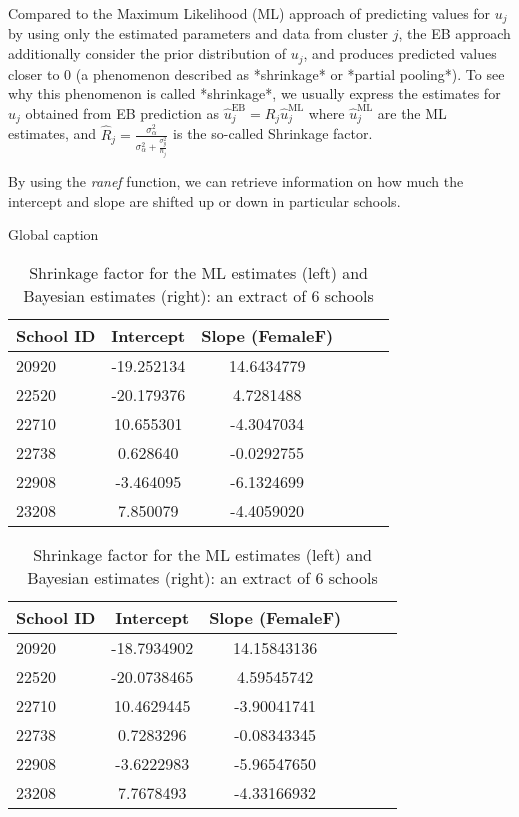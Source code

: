 Compared to the Maximum Likelihood (ML) approach of predicting values for $u_j$ by using only the estimated parameters and data from cluster $j$, the EB approach additionally consider the prior distribution of $u_{j}$, and produces predicted values closer to $0$ (a phenomenon described as *shrinkage* or *partial pooling*).  To see why this phenomenon is called *shrinkage*, we usually express the estimates for $u_j$ obtained from EB prediction as $\hat{u}_j^{\text{EB}} = \hat{R}_j\hat{u}_j^{\text{ML}}$ where $\hat{u}_j^{\text{ML}}$ are the ML estimates, and $\hat{R}_j = \frac{\sigma_\alpha^2}{\sigma_\alpha^2 + \frac{\sigma_y^2}{n_j}}$ is the so-called Shrinkage factor.

By using the \textit{ranef} function, we can retrieve information on how much the intercept and slope are shifted up or down in particular schools.

\begin{table}[!htb]
	\caption{Global caption}

	\begin{minipage}{.5\linewidth}
		\caption{}
		\centering
			{
			\begin{tabular}{l | c c c c c}
				School ID & Intercept & Slope (FemaleF)\\
				\hline
				20920 & -19.252134 & 14.6434779 \\
				22520 & -20.179376 & 4.7281488 \\
				22710 & 10.655301 & -4.3047034 \\
				22738  & 0.628640 & -0.0292755 \\
				22908 & -3.464095 & -6.1324699 \\
				23208 & 7.850079 & -4.4059020
			\end{tabular}
		}
	\end{minipage}%
	\begin{minipage}{.5\linewidth}
		\centering
		\caption{}
		{
			\begin{tabular}{l | c c c c c}
				School ID & Intercept & Slope (FemaleF)\\
				\hline
				20920 & -18.7934902 & 14.15843136 \\
				22520 & -20.0738465  & 4.59545742 \\
				22710  & 10.4629445 & -3.90041741 \\
				22738  & 0.7283296 & -0.08343345  \\
				22908 & -3.6222983 & -5.96547650 \\
				23208  & 7.7678493 & -4.33166932
			\end{tabular}
		}

	\end{minipage}
	\caption{{\small Shrinkage factor for the ML estimates (left) and Bayesian estimates (right): an extract of 6 schools}}
	\label{tab:shrinkage}
\end{table}


